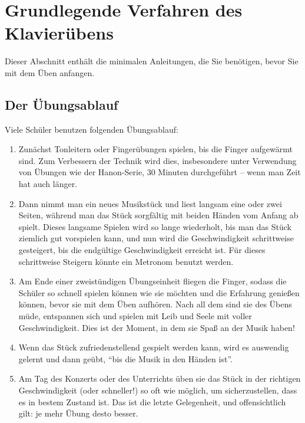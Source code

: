 
\section{Grundlegende Verfahren des Klavierübens}
\label{c1ii1}


Dieser Abschnitt enthält die minimalen Anleitungen, die Sie benötigen, bevor Sie mit dem Üben anfangen.
 

\subsection{Der Übungsablauf} 

Viele Schüler benutzen folgenden Übungsablauf:

\begin{enumerate}[label={\arabic*.}] 
\item Zunächst Tonleitern oder Fingerübungen spielen, bis die Finger aufgewärmt sind.
Zum Verbessern der Technik wird dies, insbesondere unter Verwendung von Übungen wie der Hanon-Serie, 30 Minuten durchgeführt -- wenn man Zeit hat auch länger.
\item Dann nimmt man ein neues Musikstück und liest langsam eine oder zwei Seiten, während man das Stück sorgfältig mit beiden Händen vom Anfang ab spielt.
Dieses langsame Spielen wird so lange wiederholt, bis man das Stück ziemlich gut vorspielen kann, und nun wird die Geschwindigkeit schrittweise gesteigert, bis die endgültige Geschwindigkeit erreicht ist.
Für dieses schrittweise Steigern könnte ein Metronom benutzt werden.
\item Am Ende einer zweistündigen Übungseinheit fliegen die Finger, sodass die Schüler so schnell spielen können wie sie möchten und die Erfahrung genießen können, bevor sie mit dem Üben aufhören.
Nach all dem sind sie des Übens müde, entspannen sich und spielen mit Leib und Seele mit voller Geschwindigkeit.
Dies ist der Moment, in dem sie Spaß an der Musik haben!\item Wenn das Stück zufriedenstellend gespielt werden kann, wird es auswendig gelernt und dann geübt, \enquote{bis die Musik in den Händen ist}.

\item Am Tag des Konzerts oder des Unterrichts üben sie das Stück in der richtigen Geschwindigkeit (oder schneller!) so oft wie möglich, um sicherzustellen, dass es in bestem Zustand ist.
Das ist die letzte Gelegenheit, und offensichtlich gilt: je mehr Übung desto besser.
 \end{enumerate}
